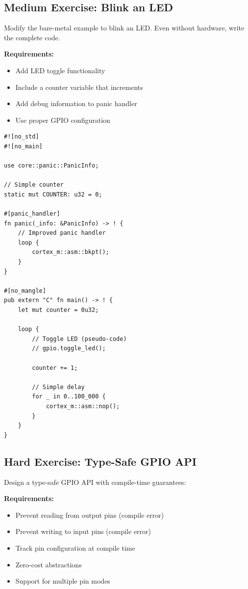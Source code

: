 \subsection{Medium Exercise: Blink an LED}
\label{subsec:medium-blink}

Modify the bare-metal example to blink an LED. Even without hardware, write the complete code.

\textbf{Requirements:}
\begin{itemize}
    \item Add LED toggle functionality
    \item Include a counter variable that increments
    \item Add debug information to panic handler
    \item Use proper GPIO configuration
\end{itemize}

\begin{verbatim}
#![no_std]
#![no_main]

use core::panic::PanicInfo;

// Simple counter
static mut COUNTER: u32 = 0;

#[panic_handler]
fn panic(_info: &PanicInfo) -> ! {
    // Improved panic handler
    loop {
        cortex_m::asm::bkpt();
    }
}

#[no_mangle]
pub extern "C" fn main() -> ! {
    let mut counter = 0u32;
    
    loop {
        // Toggle LED (pseudo-code)
        // gpio.toggle_led();
        
        counter += 1;
        
        // Simple delay
        for _ in 0..100_000 {
            cortex_m::asm::nop();
        }
    }
}
\end{verbatim}

\subsection{Hard Exercise: Type-Safe GPIO API}
\label{subsec:hard-gpio-api}

Design a type-safe GPIO API with compile-time guarantees:

\textbf{Requirements:}
\begin{itemize}
    \item Prevent reading from output pins (compile error)
    \item Prevent writing to input pins (compile error)
    \item Track pin configuration at compile time
    \item Zero-cost abstractions
    \item Support for multiple pin modes
\end{itemize}

